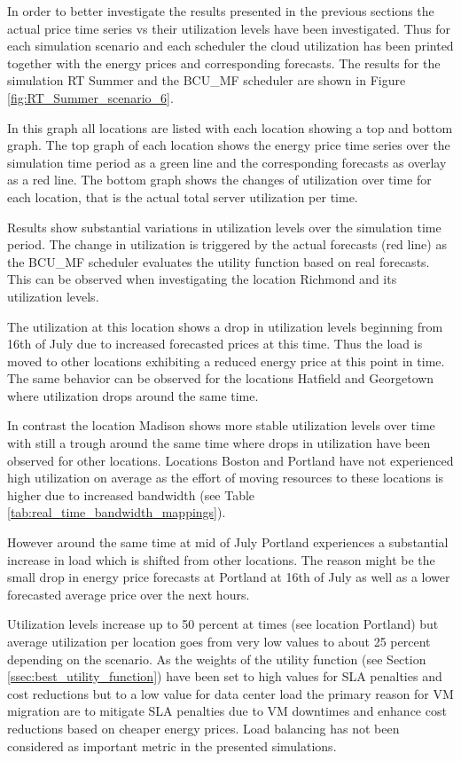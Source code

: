 In order to better investigate the results presented in the previous sections the actual price time series vs their utilization levels have been investigated. Thus for each simulation scenario and each scheduler the cloud utilization has been printed together with the energy prices and corresponding forecasts. The results for the simulation RT Summer and the BCU\_MF scheduler are shown in Figure \ref{fig:RT_Summer_scenario_6}.

In this graph all locations are listed with each location showing a top and bottom graph. The top graph of each location shows the energy price time series over the simulation time period as a green line and the corresponding forecasts as overlay as a red line. The bottom graph shows the changes of utilization over time for each location, that is the actual total server utilization per time. 

Results show substantial variations in utilization levels over the simulation time period. The change in utilization is triggered by the actual forecasts (red line) as the BCU\_MF scheduler evaluates the utility function based on real forecasts. This can be observed when investigating the location Richmond and its utilization levels. 

The utilization at this location shows a drop in utilization levels beginning from 16th of July due to increased forecasted prices at this time. Thus the load is moved to other locations exhibiting a reduced energy price at this point in time. The same behavior can be observed for the locations Hatfield and Georgetown where utilization drops around the same time. 

In contrast the location Madison shows more stable utilization levels over time with still a trough around the same time where drops in utilization have been observed for other locations. Locations Boston and Portland have not experienced high utilization on average as the effort of moving resources to these locations is higher due to increased bandwidth (see Table \ref{tab:real_time_bandwidth_mappings}). 

However around the same time at mid of July Portland experiences a substantial increase in load which is shifted from other locations. The reason might be the small drop in energy price forecasts at Portland at 16th of July as well as a lower forecasted average price over the next hours. 

Utilization levels increase up to 50 percent at times (see location Portland) but average utilization per location goes from very low values to about 25 percent depending on the scenario. As the weights of the utility function (see Section \ref{ssec:best_utility_function}) have been set to high values for SLA penalties and cost reductions but to a low value for data center load the primary reason for VM migration are to mitigate SLA penalties due to VM downtimes and enhance cost reductions based on cheaper energy prices. Load balancing has not been considered as important metric in the presented simulations. 


